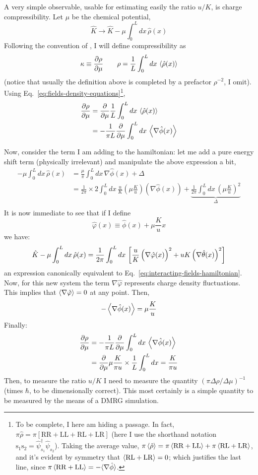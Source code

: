 A very simple observable, usable for estimating easily the ratio $u/K$, is charge compressibility. Let $\mu$ be the chemical potential,
\[
	\hat K \to \hat K - \mu \int_0^L dx \, \hat \rho(x)
\]
Following the convention of \citeauthor{giamarchi2003quantum}, I will define compressibility as
\[
	\kappa \equiv \pdv{\rho}{\mu}
	\qquad
	\rho = \frac{1}{L} \int_0^L dx \, \ev{\hat \rho(x)}
\]
(notice that usually the definition above is completed by a prefactor $\rho^{-2}$, I omit). Using Eq.~\eqref{eq:fields-density-equations}\footnote{
	To be complete, I here am hiding a passage. In fact, $\pi \hat \rho = \pi \left[ \mathrm{RR} + \mathrm{LL} + \mathrm{RL} + \mathrm{LR} \right]$ (here I use the shorthand notation $\mathrm{s}_1 \mathrm{s}_2 = \hat \psi_{s_1}^\dagger \hat \psi_{s_2}$). Taking the average value, $\pi \ev{\hat \rho} = \pi \ev{ \mathrm{RR} + \mathrm{LL}} + \pi \ev{\mathrm{RL} + \mathrm{LR}}$, and it's evident by symmetry that $\ev{\mathrm{RL} + \mathrm{LR}} = 0$; which justifies the last line, since $\pi \ev{ \mathrm{RR} + \mathrm{LL}} = - \langle \nabla \hat \phi \rangle$.
},
\[
\begin{aligned}
	\pdv{\rho}{\mu} &= \pdv{}{\mu} \frac{1}{L} \int_0^L dx \, \ev{\hat \rho(x)} \\
	&= - \frac{1}{\pi L} \pdv{}{\mu} \int_0^L dx \, \ev{\nabla \hat \phi(x)}
\end{aligned}
\]

Now, consider the term I am adding to the hamiltonian: let me add a pure energy shift term (physically irrelevant) and manipulate the above expression a bit,
\[
\begin{aligned}
	- \mu \int_0^L dx \, \hat \rho(x) &= \frac{\mu}{\pi} \int_0^L dx \, \nabla \hat \phi(x) + \Delta \\
	&= \frac{1}{2\pi} \times 2 \int_0^L dx \, \frac{u}{K} \left( \mu \frac{K}{u} \right) \left( \nabla \hat \phi(x) \right) + \underbrace{
		\frac{1}{2\pi} \int_0^L dx \, \left( \mu \frac{K}{u} \right)^2
	}_{\Delta} \\
\end{aligned}	
\]
It is now immediate to see that if I define
\[
	\hat \varphi(x) \equiv \hat \phi(x) + \mu \frac{K}{u} x
\]
we have:
\[
	\hat K - \mu \int_0^L dx \, \hat \rho(x) =  \frac{1}{2\pi} \int_0^L dx \, \left[ \frac{u}{K} \left( \vphantom{\hat\theta} \nabla \hat \varphi(x) \right)^2 + uK \left( \nabla \hat \theta(x) \right)^2 \right]
\]
an expression canonically equivalent to Eq.~\eqref{eq:interacting-fields-hamiltonian}. Now, for this new system the term $\nabla \hat \varphi$ represents charge density fluctuations. This implies that $\ev{\nabla \hat \varphi} = 0$ at any point. Then,
\[
	- \ev{\nabla \hat \phi(x)} = \mu \frac{K}{u}
\]
Finally:
\[
\begin{aligned}
	\pdv{\rho}{\mu}	&= - \frac{1}{\pi L} \pdv{}{\mu} \int_0^L dx \, \ev{\nabla \hat \phi(x)} \\
	&= \pdv{}{\mu} \mu \frac{K}{\pi u} \times \frac{1}{L} \int_0^L dx = \frac{K}{\pi u}
\end{aligned}
\]
Then, to measure the ratio $u/K$ I need to measure the quantity $(\pi \Delta \rho / \Delta \mu)^{-1}$ (times $\hbar$, to be dimensionally correct). This most certainly is a simple quantity to be measured by the means of a DMRG simulation.

